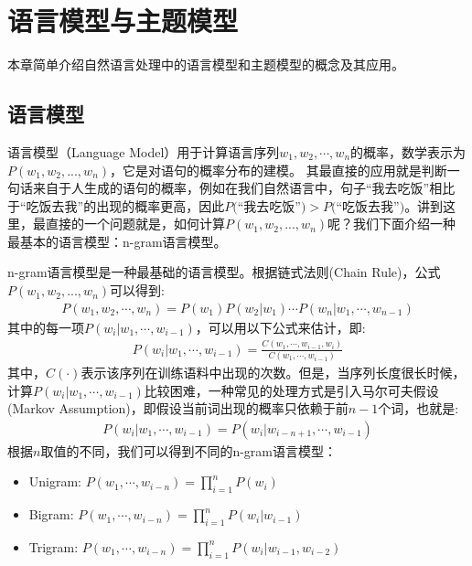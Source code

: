 %
%
%
\chapter{语言模型与主题模型}
\label{lm}

本章简单介绍自然语言处理中的语言模型和主题模型的概念及其应用。


\section{语言模型}

语言模型（Language Model）用于计算语言序列$w_1, w_2, \cdots, w_n$的概率，数学表示为$P(w_1, w_2, ..., w_n)$，它是对语句的概率分布的建模。
其最直接的应用就是判断一句话来自于人生成的语句的概率，例如在我们自然语言中，句子``我去吃饭''相比于``吃饭去我''的出现的概率更高，因此$P($``我去吃饭''$) > P($``吃饭去我''$)$。讲到这里，最直接的一个问题就是，如何计算$P(w_1, w_2, ..., w_n)$呢？我们下面介绍一种最基本的语言模型：n-gram语言模型。

n-gram语言模型是一种最基础的语言模型。根据链式法则(Chain Rule)，公式$P(w_1, w_2, ..., w_n)$可以得到:
\begin{equation} \nonumber
\label{equ:ab}
\begin{aligned}
P(w_1, w_2, \cdots, w_n)=P(w_1)P(w_2|w_1)\cdots P(w_n|w_1,\cdots,w_{n-1})
\end{aligned}
\end{equation}
其中的每一项$P(w_i|w_1,\cdots,w_{i-1})$，可以用以下公式来估计，即:
\begin{equation} \nonumber
\label{equ:ab}
\begin{aligned}
P(w_i|w_1,\cdots,w_{i-1}) = \frac{C(w_1,\cdots, w_{i-1}, w_i) }{C(w_1,\cdots,w_{i-1})}
\end{aligned}
\end{equation}
其中，$C(\cdot)$表示该序列在训练语料中出现的次数。但是，当序列长度很长时候，计算$P(w_i|w_1,\cdots,w_{i-1})$比较困难，一种常见的处理方式是引入马尔可夫假设(Markov Assumption)，即假设当前词出现的概率只依赖于前$n-1$个词，也就是:
\begin{equation} \nonumber
\label{equ:ab}
\begin{aligned}
P(w_i|w_1,\cdots,w_{i-1}) = P(w_i|w_{i-n+1},\cdots,w_{i-1})
\end{aligned}
\end{equation}
根据$n$取值的不同，我们可以得到不同的n-gram语言模型：
\begin{itemize}
    \item Unigram: $P(w_1, \cdots, w_{i-n})=\prod_{i=1}^{n} P(w_i)$
	\item Bigram: $P(w_1, \cdots, w_{i-n})=\prod_{i=1}^{n} P(w_i|w_{i-1})$
	\item Trigram: $P(w_1, \cdots, w_{i-n})=\prod_{i=1}^{n} P(w_i|w_{i-1},w_{i-2})$
\end{itemize}

